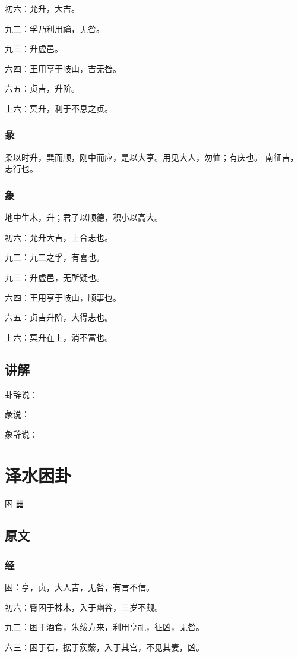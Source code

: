 \documentclass[12pt,oneside]{book}
\begin{document}
初六：允升，大吉。

九二：孚乃利用禴，无咎。

九三：升虚邑。

六四：王用亨于岐山，吉无咎。

六五：贞吉，升阶。

上六：冥升，利于不息之贞。


\subsection{彖}
柔以时升，巽而顺，刚中而应，是以大亨。用见大人，勿恤；有庆也。 南征吉，志行也。

\subsection{象}
地中生木，升；君子以顺德，积小以高大。

初六：允升大吉，上合志也。

九二：九二之孚，有喜也。

九三：升虚邑，无所疑也。

六四：王用亨于岐山，顺事也。

六五：贞吉升阶，大得志也。

上六：冥升在上，消不富也。

\section{讲解}
卦辞说：

彖说：

象辞说：

\chapter{泽水困卦}
困 {\Large ䷮}

\section{原文}

\subsection{经}
困：亨，贞，大人吉，无咎，有言不信。

初六：臀困于株木，入于幽谷，三岁不觌。

九二：困于酒食，朱绂方来，利用亨祀，征凶，无咎。

六三：困于石，据于蒺藜，入于其宫，不见其妻，凶。
\end{document}
